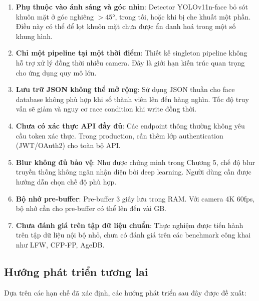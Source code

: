 \begin{enumerate}[1.]
    \item \textbf{Phụ thuộc vào ánh sáng và góc nhìn}: Detector YOLOv11n-face bỏ sót khuôn mặt ở góc nghiêng $> 45°$, trong tối, hoặc khi bị che khuất một phần. Điều này có thể để lọt khuôn mặt chưa được ẩn danh hoá trong một số khung hình.
    
    \item \textbf{Chỉ một pipeline tại một thời điểm}: Thiết kế singleton pipeline không hỗ trợ xử lý đồng thời nhiều camera. Đây là giới hạn kiến trúc quan trọng cho ứng dụng quy mô lớn.
    
    \item \textbf{Lưu trữ JSON không thể mở rộng}: Sử dụng JSON thuần cho face database không phù hợp khi số thành viên lên đến hàng nghìn. Tốc độ truy vấn sẽ giảm và nguy cơ race condition khi write đồng thời.
    
    \item \textbf{Chưa có xác thực API đầy đủ}: Các endpoint thông thường không yêu cầu token xác thực. Trong production, cần thêm lớp authentication (JWT/OAuth2) cho toàn bộ API.
    
    \item \textbf{Blur không đủ bảo vệ}: Như được chứng minh trong Chương 5, chế độ blur truyền thống không ngăn nhận diện bởi deep learning. Người dùng cần được hướng dẫn chọn chế độ phù hợp.
    
    \item \textbf{Bộ nhớ pre-buffer}: Pre-buffer 3 giây lưu trong RAM. Với camera 4K 60fps, bộ nhớ cần cho pre-buffer có thể lên đến vài GB.
    
    \item \textbf{Chưa đánh giá trên tập dữ liệu chuẩn}: Thực nghiệm được tiến hành trên tập dữ liệu nội bộ nhỏ, chưa có đánh giá trên các benchmark công khai như LFW, CFP-FP, AgeDB.
\end{enumerate}

\subsection{Hướng phát triển tương lai}
\label{subsec:huongphat}

Dựa trên các hạn chế đã xác định, các hướng phát triển sau đây được đề xuất:

